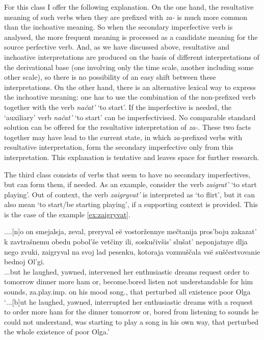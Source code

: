For this class I offer the following explanation. On the one hand, the resultative meaning of such verbs when they are prefixed with \textit{za-} is much more common than the inchoative meaning. So when the secondary imperfective verb is analysed, the more frequent meaning is processed as a candidate meaning for the source perfective verb. And, as we have discussed above, resultative and inchoative interpretations are produced on the basis of different interpretations of the derivational base (one involving only the time scale, another including some other scale), so there is no possibility of an easy shift between these interpretations. On the other hand, there is an alternative lexical way to express the inchoative meaning: one has to use the combination of the non-prefixed verb together with the verb \textit{na\v{c}at'} `to start'. If the imperfective is needed, the `auxiliary' verb \textit{na\v{c}at'} `to start' can be imperfectivised. No comparable standard solution can be offered for the resultative interpretation of \textit{za-}. These two facts together may have lead to the current state, in which \textit{za-}prefixed verbs with resultative interpretation, form the secondary imperfective only from this interpretation. This explanation is tentative and leaves space for further research.

The third class consists of verbs that seem to have no secondary imperfectives, but can form them, if needed. As an example, consider the verb \textit{zaigrat'} `to start playing'. Out of context, the verb \textit{zaigryvat'} is interpreted as `to flirt', but it can also mean `to start/be starting playing', if a supporting context is provided. This is the case of the example \ref{ex:zaigryvat}. 

\exg.\label{ex:zaigryvat}$\ldots$[n]o on smejalsja, zeval, preryval e\"{e} vostor\v{z}ennye me\v{c}tanija pros'boju zakazat' k zavtra\v{s}nemu obedu pobol'\v{s}e vet\v{c}iny ili, sosku\v{c}iv\v{s}is' slu\v{s}at' neponjatnye dlja nego zvuki, zaigryval na svoj lad pesenku, kotoraja vozmu\v{s}\v{c}ala vs\"{e} su\v{s}\v{c}estvovanie bednoj Ol'gi.\\
$\ldots$but he laughed, yawned, intervened her enthusiastic dreams request order to tomorrow dinner more ham or, {become.bored} listen {not understandable} for him sounds, za.play.imp. on his mood song., that perturbed all existence poor Olga\\
\trans `$\ldots$[b]ut he laughed, yawned, interrupted her enthusiastic dreams with a request to order more ham for the dinner tomorrow or, bored from listening to sounds he could not understand, was starting to play a song in his own way, that perturbed the whole existence of poor Olga.'\\

